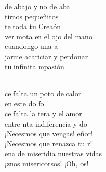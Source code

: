 \begin{cancion}
	de abajo y no de aba\\
	tirnos pequeñitos \\
	te toda tu Creaón\\
	 ver mota en el ojo del mano \\
	cuandongo una a\\
	jarme acariciar y perdonar\\
	 tu infinita mpasión\\\jump\\
	\begin{chorus}%
	ce falta un poto de calor \\
	en este do fo\\
	ce falta la tera y el amor \\
	entre nta indiferencia y do\\
	¡Necesmos que vengas! eñor!\\
	¡Necesmos que renazca tu r!\\
	ena de miseridia nuestras vidas\\
	¡znos misericorsos! ¡Oh, os! \\
	\end{chorus}%
	\jump\\
\end{cancion}%
